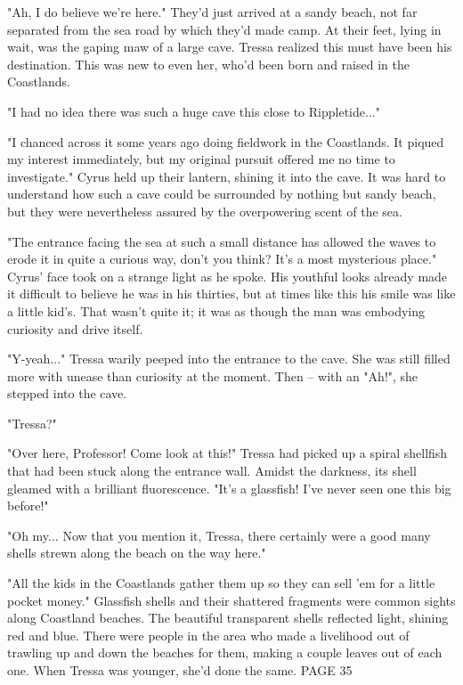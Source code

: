 "Ah, I do believe we're here." They'd just arrived at a sandy beach, not far separated from the sea road by which they'd made camp. At their feet, lying in wait, was the gaping maw of a large cave. Tressa realized this must have been his destination. This was new to even her, who'd been born and raised in the Coastlands.

"I had no idea there was such a huge cave this close to Rippletide..."

"I chanced across it some years ago doing fieldwork in the Coastlands. It piqued my interest immediately, but my original pursuit offered me no time to investigate." Cyrus held up their lantern, shining it into the cave. It was hard to understand how such a cave could be surrounded by nothing but sandy beach, but they were nevertheless assured by the overpowering scent of the sea.

"The entrance facing the sea at such a small distance has allowed the waves to erode it in quite a curious way, don't you think? It's a most mysterious place." Cyrus' face took on a strange light as he spoke. His youthful looks already made it difficult to believe he was in his thirties, but at times like this his smile was like a little kid's. That wasn't quite it; it was as though the man was embodying curiosity and drive itself. 

"Y-yeah..." Tressa warily peeped into the entrance to the cave. She was still filled more with unease than curiosity at the moment. Then -- with an "Ah!", she stepped into the cave.

"Tressa?"

"Over here, Professor! Come look at this!" Tressa had picked up a spiral shellfish that had been stuck along the entrance wall. Amidst the darkness, its shell gleamed with a brilliant fluorescence. "It's a glassfish! I've never seen one this big before!"

"Oh my... Now that you mention it, Tressa, there certainly were a good  many shells strewn along the beach on the way here."

"All the kids in the Coastlands gather them up so they can sell 'em for a little pocket money." Glassfish shells and their shattered fragments were common sights along Coastland beaches. The beautiful transparent shells reflected light, shining red and blue. There were people in the area who made a livelihood out of trawling up and down the beaches for them, making a couple leaves out of each one. When Tressa was younger, she'd done the same.  PAGE 35